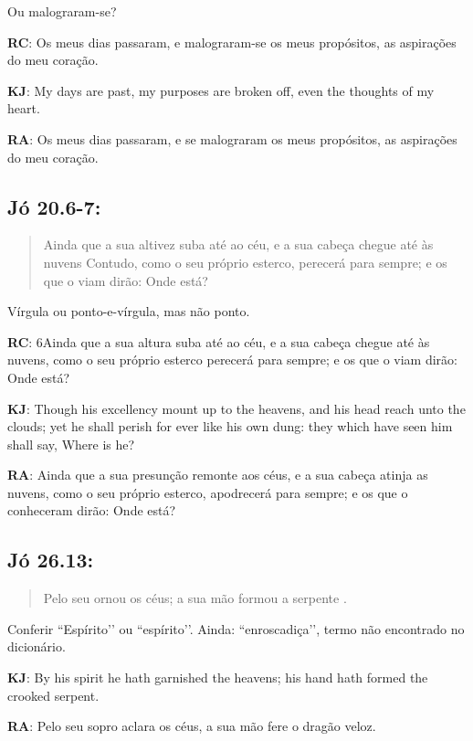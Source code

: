 Ou malograram-se?

\textbf{RC}: Os meus dias passaram, e malograram-se os meus propósitos, as aspirações do meu coração.

\textbf{KJ}: My days are past, my purposes are broken off, even the thoughts of my heart.

\textbf{RA}: Os meus dias passaram, e se malograram os meus propósitos, as aspirações do meu coração.

\subsection*{Jó 20.6-7:} 
 \begin{quote}
    \small
Ainda que a sua altivez suba até ao céu, e a sua cabeça chegue até às nuvens Contudo, como o seu próprio esterco, perecerá para sempre; e os que o viam dirão: Onde está?
\end{quote}

Vírgula ou ponto-e-vírgula, mas não ponto.

\textbf{RC}: 6Ainda que a sua altura suba até ao céu, e a sua cabeça chegue até às nuvens, como o seu próprio esterco perecerá para sempre; e os que o viam dirão: Onde está?

\textbf{KJ}: Though his excellency mount up to the heavens, and his head reach unto the clouds; yet he shall perish for ever like his own dung: they which have seen him shall say, Where is he?

\textbf{RA}: Ainda que a sua presunção remonte aos céus, e a sua cabeça atinja as nuvens, como o seu próprio esterco, apodrecerá para sempre; e os que o conheceram dirão: Onde está?

\subsection*{Jó 26.13:} 
 \begin{quote}
    \small
Pelo seu  ornou os céus; a sua mão formou a serpente .
\end{quote}

Conferir ``Espírito’’ ou ``espírito’’. Ainda: ``enroscadiça’’, termo não encontrado no dicionário.

\textbf{KJ}: By his spirit he hath garnished the heavens; his hand hath formed the crooked serpent.

\textbf{RA}: Pelo seu sopro aclara os céus, a sua mão fere o dragão veloz.

